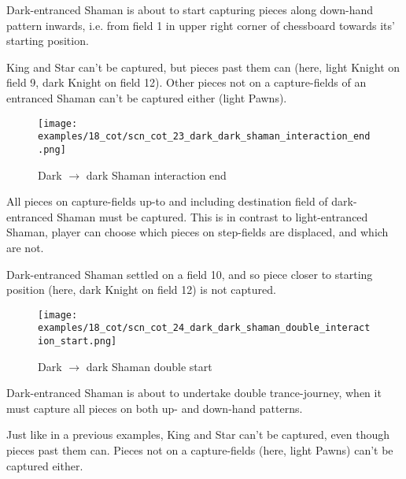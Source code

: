 Dark-entranced Shaman is about to start capturing pieces along down-hand pattern inwards,
i.e. from field 1 in upper right corner of chessboard towards its' starting position.

King and Star can't be captured, but pieces past them can (here, light Knight on field 9,
dark Knight on field 12). Other pieces not on a capture-fields of an entranced Shaman can't
be captured either (light Pawns).

\clearpage %

\noindent
\begin{figure}[!h]
\texttt{[image: examples/18\_cot/scn\_cot\_23\_dark\_dark\_shaman\_interaction\_end.png]}
\caption{Dark $\rightarrow$ dark Shaman interaction end}
\label{fig:scn_cot_23_dark_dark_shaman_interaction_end}
\end{figure}

All pieces on capture-fields up-to and including destination field of dark-entranced Shaman
must be captured. This is in contrast to light-entranced Shaman, player can choose which
pieces on step-fields are displaced, and which are not.

Dark-entranced Shaman settled on a field 10, and so piece closer to starting position (here,
dark Knight on field 12) is not captured.

\clearpage %

\noindent
\begin{figure}[!h]
\texttt{[image: examples/18\_cot/scn\_cot\_24\_dark\_dark\_shaman\_double\_interaction\_start.png]}
\caption{Dark $\rightarrow$ dark Shaman double start}
\label{fig:scn_cot_24_dark_dark_shaman_double_interaction_start}
\end{figure}

Dark-entranced Shaman is about to undertake double trance-journey, when it must capture all
pieces on both up- and down-hand patterns.

Just like in a previous examples, King and Star can't be captured, even though pieces past
them can. Pieces not on a capture-fields (here, light Pawns) can't be captured either.

\clearpage %

